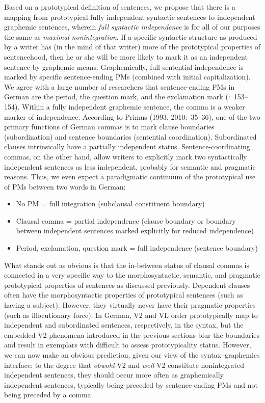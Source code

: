Based on a prototypical definition of sentences, we propose that there is a mapping from prototypical fully independent syntactic sentences to independent graphemic sentences, wherein \textit{full} \textit{syntactic} \textit{independence} is for all of our purposes the same as \textit{maximal} \textit{nonintegration}. If a specific syntactic structure as produced by a writer has (in the mind of that writer) more of the prototypical properties of sentencehood, then he or she will be more likely to mark it as an independent sentence by graphemic means. Graphemically, full sentential independence is marked by specific sentence-ending PMs (combined with initial capitalization). We agree with a large number of researchers that sentence-ending PMs in German are the period, the question mark, and the exclamation mark (\citealt{Dürscheid2006}:~153–154). Within a fully independent graphemic sentence, the comma is a weaker marker of independence. According to Primus (1993, 2010:~35–36), one of the two primary functions of German commas is to mark clause boundaries (subordination) and sentence boundaries (sentential coordination). Subordinated clauses intrinsically have a partially independent status. Sentence-coordinating commas, on the other hand, allow writers to explicitly mark two syntactically independent sentences as less independent, probably for semantic and pragmatic reasons. Thus, we even expect a paradigmatic continuum of the prototypical use of PMs between two words in German:


\begin{itemize}
  \item No PM = full integration (subclausal constituent boundary)
  \item Clausal comma = partial independence (clause boundary or boundary between independent sentences marked explicitly for reduced independence)
  \item Period, exclamation, question mark = full independence (sentence boundary)
\end{itemize}

What stands out as obvious is that the in-between status of clausal commas is connected in a very specific way to the morphosyntactic, semantic, and pragmatic prototypical properties of sentences as discussed previously. Dependent clauses often have the morphosyntactic properties of prototypical sentences (such as having a subject). However, they virtually never have their pragmatic properties (such as illocutionary force). In German, V2 and VL order prototypically map to independent and subordinated sentences, respectively, in the syntax, but the embedded V2 phenomena introduced in the previous sections blur the boundaries and result in exemplars with difficult to assess prototypicality status. However, we can now make an obvious prediction, given our view of the syntax–graphemics interface: to the degree that \textit{obwohl}{}-V2 and \textit{weil}{}-V2 constitute nonintegrated independent sentences, they should occur more often as graphemically independent sentences, typically being preceded by sentence-ending PMs and not being preceded by a comma.



